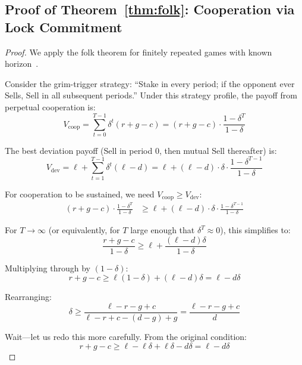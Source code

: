 \subsection{Proof of Theorem~\ref{thm:folk}: Cooperation via Lock Commitment}

\begin{proof}
We apply the folk theorem for finitely repeated games with known
horizon~\citep{fudenberg1991game}.

Consider the grim-trigger strategy: ``Stake in every period; if the opponent
ever Sells, Sell in all subsequent periods.'' Under this strategy profile, the
payoff from perpetual cooperation is:
\begin{equation}
  V_{\text{coop}} = \sum_{t=0}^{T-1} \delta^t (r + g - c) = (r + g - c) \cdot \frac{1 - \delta^T}{1 - \delta}
\end{equation}

The best deviation payoff (Sell in period 0, then mutual Sell thereafter) is:
\begin{equation}
  V_{\text{dev}} = \ell + \sum_{t=1}^{T-1} \delta^t (\ell - d) = \ell + (\ell - d) \cdot \delta \cdot \frac{1 - \delta^{T-1}}{1 - \delta}
\end{equation}

For cooperation to be sustained, we need $V_{\text{coop}} \geq V_{\text{dev}}$:
\begin{align}
  (r + g - c) \cdot \frac{1 - \delta^T}{1 - \delta} &\geq \ell + (\ell - d) \cdot \delta \cdot \frac{1 - \delta^{T-1}}{1 - \delta}
\end{align}

For $T \to \infty$ (or equivalently, for $T$ large enough that $\delta^T
\approx 0$), this simplifies to:
\begin{equation}
  \frac{r + g - c}{1 - \delta} \geq \ell + \frac{(\ell - d)\delta}{1 - \delta}
\end{equation}

Multiplying through by $(1 - \delta)$:
\begin{equation}
  r + g - c \geq \ell(1 - \delta) + (\ell - d)\delta = \ell - d\delta
\end{equation}

Rearranging:
\begin{equation}
  \delta \geq \frac{\ell - r - g + c}{\ell - r + c - (d - g) + g} = \frac{\ell - r - g + c}{d}
\end{equation}

Wait---let us redo this more carefully. From the original condition:
\begin{equation}
  r + g - c \geq \ell - \ell\delta + \ell\delta - d\delta = \ell - d\delta
\end{equation}


\end{proof}

